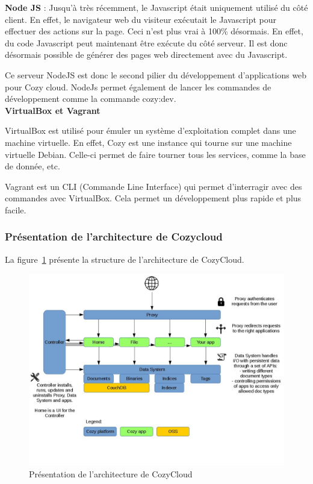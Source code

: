 \textbf{Node JS} : Jusqu'à très récemment, le Javascript était uniquement utilisé du côté client. En effet, le navigateur web du visiteur exécutait le Javascript pour effectuer des actions sur la page.
Ceci n'est plus vrai à 100\% désormais. En effet, du code Javascript peut maintenant être exécute du côté serveur. Il est donc désormais possible de générer des pages web directement avec du Javascript. 

Ce serveur NodeJS est donc le second pilier du développement d'applications web pour Cozy cloud. NodeJs permet également de lancer les commandes de développement comme la commande cozy:dev. \\


\textbf{VirtualBox et Vagrant}

VirtualBox est utilisé pour émuler un système d'exploitation complet dans une machine virtuelle. En effet, Cozy est une instance qui tourne sur une machine virtuelle Debian. Celle-ci permet de faire tourner tous les services, comme la base de donnée, etc.

Vagrant est un CLI (Commande Line Interface) qui permet d'interragir avec des commandes avec VirtualBox. Cela permet un développement plus rapide et plus facile. \\

\subsubsection{Présentation de l'architecture de Cozycloud}

La figure~\ref{fig:figArchi} présente la structure de l'architecture de CozyCloud. 

\begin{figure}[!ht]
\begin{center}
\includegraphics[scale = 0.3]{img/cozy-architecture.jpg}
\end{center}
\caption{Présentation de l'architecture de CozyCloud}
\label{fig:figArchi} 
\end{figure}

